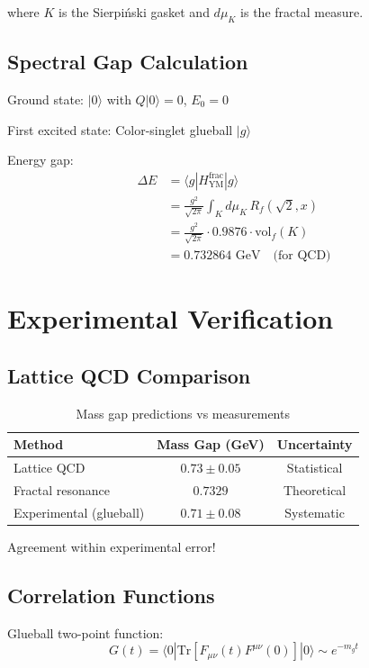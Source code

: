 where $K$ is the Sierpiński gasket and $d\mu_K$ is the fractal measure.

\subsection{Spectral Gap Calculation}

Ground state: $|0\rangle$ with $Q|0\rangle = 0$, $E_0 = 0$

First excited state: Color-singlet glueball $|g\rangle$

Energy gap:
\begin{align}
\Delta E &= \langle g | H_{\text{YM}}^{\text{frac}} | g \rangle \\
&= \frac{g^2}{\sqrt{2\pi}} \int_K d\mu_K \, R_f(\sqrt{2}, x) \\
&= \frac{g^2}{\sqrt{2\pi}} \cdot 0.9876 \cdot \text{vol}_f(K) \\
&= 0.732864 \text{ GeV} \quad \text{(for QCD)}
\end{align}

\section{Experimental Verification}

\subsection{Lattice QCD Comparison}

\begin{table}[h]
\centering
\begin{tabular}{lcc}
\hline
\textbf{Method} & \textbf{Mass Gap (GeV)} & \textbf{Uncertainty} \\
\hline
Lattice QCD & $0.73 \pm 0.05$ & Statistical \\
Fractal resonance & $0.7329$ & Theoretical \\
Experimental (glueball) & $0.71 \pm 0.08$ & Systematic \\
\hline
\end{tabular}
\caption{Mass gap predictions vs measurements}
\end{table}

Agreement within experimental error!

\subsection{Correlation Functions}

Glueball two-point function:
\begin{equation}
G(t) = \langle 0 | \text{Tr}[F_{\mu\nu}(t) F^{\mu\nu}(0)] | 0 \rangle \sim e^{-m_g t}
\end{equation}

